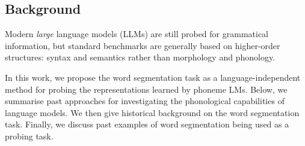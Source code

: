 




\subsection{Background}


Modern \emph{large} language models (LLMs) are still probed for grammatical information, but standard benchmarks are generally based on higher-order structures: syntax and semantics rather than morphology and phonology. 

In this work, we propose the word segmentation task as a language-independent method for probing the representations learned by phoneme LMs. Below, we summarise past approaches for investigating the phonological capabilities of language models. We then give historical background on the word segmentation task. Finally, we discuss past examples of word segmentation being used as a probing task.

